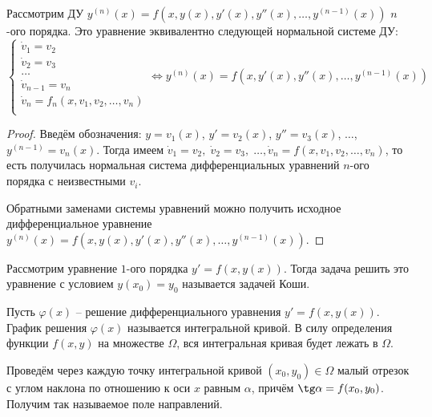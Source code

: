 \begin{proposition}
    Рассмотрим ДУ $y^{(n)}(x) = f(x, y(x), y'(x), y''(x), \dots, y^{(n-1)}(x))$ $n$-ого порядка. Это уравнение эквивалентно следующей нормальной системе ДУ:
    \begin{equation}
        \begin{cases}
            \dot v_1 = v_2 \\
            \dot v_2 = v_3 \\
            \dots \\
            \dot v_{n-1} = v_n \\
            \dot v_n = f_n(x, v_1, v_2, \dots, v_n) \\
        \end{cases}
        \Leftrightarrow y^{(n)}(x) = f(x, y'(x), y''(x), \dots, y^{(n-1)}(x))
    \end{equation}
\end{proposition}

\begin{proof}
    Введём обозначения: $y = v_1(x)$, $y' = v_2(x)$,
    $y'' = v_3(x)$, $\dots$, $y^{(n - 1)} = v_n(x)$. Тогда имеем $\dot v_1 = v_2, \; \dot v_2 = v_3, \; \dots, \dot v_n = f(x, v_1, v_2, \dots, v_n)$, то есть получилась нормальная система дифференциальных уравнений $n$-ого порядка с неизвестными $v_i$.

    Обратными заменами системы уравнений можно получить исходное дифференциальное уравнение $y^{(n)}(x) = f(x, y(x), y'(x), y''(x), \dots, y^{(n-1)}(x))$.
\end{proof}

\begin{definition}
    Рассмотрим уравнение $1$-ого порядка $y' = f(x, y(x))$. Тогда задача решить это уравнение с условием $y(x_0) = y_0$ называется задачей Коши.
\end{definition}

\begin{definition}
    Пусть $\varphi(x)$ -- решение дифференциального уравнения $y' = f(x, y(x))$. График решения $\varphi(x)$ называется интегральной кривой. В силу определения функции $f(x, y)$ на множестве $\Omega$, вся интегральная кривая будет лежать в $\Omega$.
\end{definition}

\begin{definition}
    Проведём через каждую точку интегральной кривой $(x_0, y_0) \in \Omega$ малый отрезок с углом наклона по отношению к оси $x$ равным $\alpha$, причём $\tg \alpha = f(x_0, y_0)$. Получим так называемое поле направлений. 
\end{definition}

